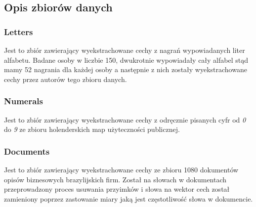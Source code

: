 \documentclass{classrep}
\begin{document}
{        \subsection{Opis zbiorów danych}
        \label{opis_zbiorow_intro} {

            \subsubsection{Letters} {
                Jest to zbiór \cite{dataset_letters} zawierający wyekstrachowane cechy
                z nagrań wypowiadanych liter alfabetu. Badane osoby w liczbie 150,
                dwukrotnie wypowiadały cały alfabel stąd mamy 52 nagrania dla każdej
                osoby a następnie z nich zostały wyekstrachowane cechy przez autorów
                tego zbioru danych.
            }

            \subsubsection{Numerals} {
                Jest to zbiór \cite{dataset_numerals} zawierający wyekstrachowane cechy
                z odręcznie pisanych cyfr od \textit{0} do \textit{9} ze zbioru
                holenderskich map użyteczności publicznej.
            }

            \subsubsection{Documents} {
                Jest to zbiór \cite{dataset_documents} zawierający wyekstrachowane cechy
                ze zbioru 1080 dokumentów opisów biznesowych brazylijskich firm.
                Został na słowach w dokumentach przeprowadzony proces usuwania 
                przyimków i słowa na wektor cech został zamieniony poprzez zastowanie
                miary jaką jest częstotliwość słowa w dokumencie.
            }

        }
    }
    \newpage
\end{document}
